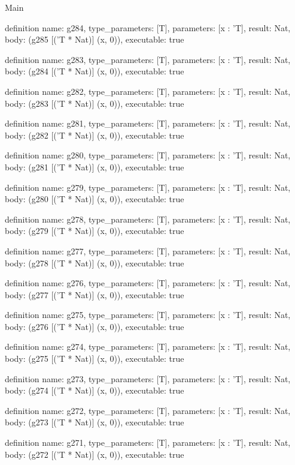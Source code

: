 \begin{lexlean}{Main}
\begin{semanticmodule}
definition{
  name: g284,
  type_parameters: [T],
  parameters: [x : 'T],
  result: Nat,
  body: (g285 [('T * Nat)] (x, 0)),
  executable: true
}

definition{
  name: g283,
  type_parameters: [T],
  parameters: [x : 'T],
  result: Nat,
  body: (g284 [('T * Nat)] (x, 0)),
  executable: true
}

definition{
  name: g282,
  type_parameters: [T],
  parameters: [x : 'T],
  result: Nat,
  body: (g283 [('T * Nat)] (x, 0)),
  executable: true
}

definition{
  name: g281,
  type_parameters: [T],
  parameters: [x : 'T],
  result: Nat,
  body: (g282 [('T * Nat)] (x, 0)),
  executable: true
}

definition{
  name: g280,
  type_parameters: [T],
  parameters: [x : 'T],
  result: Nat,
  body: (g281 [('T * Nat)] (x, 0)),
  executable: true
}

definition{
  name: g279,
  type_parameters: [T],
  parameters: [x : 'T],
  result: Nat,
  body: (g280 [('T * Nat)] (x, 0)),
  executable: true
}

definition{
  name: g278,
  type_parameters: [T],
  parameters: [x : 'T],
  result: Nat,
  body: (g279 [('T * Nat)] (x, 0)),
  executable: true
}

definition{
  name: g277,
  type_parameters: [T],
  parameters: [x : 'T],
  result: Nat,
  body: (g278 [('T * Nat)] (x, 0)),
  executable: true
}

definition{
  name: g276,
  type_parameters: [T],
  parameters: [x : 'T],
  result: Nat,
  body: (g277 [('T * Nat)] (x, 0)),
  executable: true
}

definition{
  name: g275,
  type_parameters: [T],
  parameters: [x : 'T],
  result: Nat,
  body: (g276 [('T * Nat)] (x, 0)),
  executable: true
}

definition{
  name: g274,
  type_parameters: [T],
  parameters: [x : 'T],
  result: Nat,
  body: (g275 [('T * Nat)] (x, 0)),
  executable: true
}

definition{
  name: g273,
  type_parameters: [T],
  parameters: [x : 'T],
  result: Nat,
  body: (g274 [('T * Nat)] (x, 0)),
  executable: true
}

definition{
  name: g272,
  type_parameters: [T],
  parameters: [x : 'T],
  result: Nat,
  body: (g273 [('T * Nat)] (x, 0)),
  executable: true
}

definition{
  name: g271,
  type_parameters: [T],
  parameters: [x : 'T],
  result: Nat,
  body: (g272 [('T * Nat)] (x, 0)),
  executable: true
}


\end{semanticmodule}
\end{lexlean}
